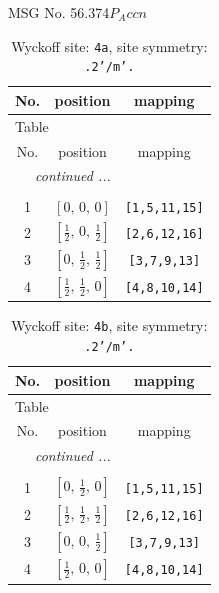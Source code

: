 \documentclass[fleqn,8pt]{jsarticle}
\begin{document}
\setcounter{MaxMatrixCols}{32}

\renewcommand{\tablename}{Table~}
\renewcommand{\figurename}{Figure~}
\begin{center}
\LARGE
MSG No. 56.374\quad$P_{A}ccn$
\end{center}
\renewcommand{\arraystretch}{1.2}
\begin{longtable}{ccc}
\caption{Wyckoff site: {\tt 4a}, site symmetry: {\tt .2'/m'.}}
 \\
 \hline \hline
No. & position & mapping \\ \hline \endfirsthead

\multicolumn{2}{l}{\tablename\ \thetable{}} \\
 \hline \hline
No. & position & mapping \\ \hline \endhead

 \hline \hline
\multicolumn{2}{r}{\footnotesize\it continued ...} \\ \endfoot

 \hline \hline
\multicolumn{2}{r}{} \\ \endlastfoot

1 & $\left[ 0,\, 0,\, 0 \right]$ & {\tt [1,5,11,15]} \\ \hline
2 & $\left[ \frac{1}{2},\, 0,\, \frac{1}{2} \right]$ & {\tt [2,6,12,16]} \\ \hline
3 & $\left[ 0,\, \frac{1}{2},\, \frac{1}{2} \right]$ & {\tt [3,7,9,13]} \\ \hline
4 & $\left[ \frac{1}{2},\, \frac{1}{2},\, 0 \right]$ & {\tt [4,8,10,14]} \\
\end{longtable}
\renewcommand{\arraystretch}{1.2}
\begin{longtable}{ccc}
\caption{Wyckoff site: {\tt 4b}, site symmetry: {\tt .2'/m'.}}
 \\
 \hline \hline
No. & position & mapping \\ \hline \endfirsthead

\multicolumn{2}{l}{\tablename\ \thetable{}} \\
 \hline \hline
No. & position & mapping \\ \hline \endhead

 \hline \hline
\multicolumn{2}{r}{\footnotesize\it continued ...} \\ \endfoot

 \hline \hline
\multicolumn{2}{r}{} \\ \endlastfoot

1 & $\left[ 0,\, \frac{1}{2},\, 0 \right]$ & {\tt [1,5,11,15]} \\ \hline
2 & $\left[ \frac{1}{2},\, \frac{1}{2},\, \frac{1}{2} \right]$ & {\tt [2,6,12,16]} \\ \hline
3 & $\left[ 0,\, 0,\, \frac{1}{2} \right]$ & {\tt [3,7,9,13]} \\ \hline
4 & $\left[ \frac{1}{2},\, 0,\, 0 \right]$ & {\tt [4,8,10,14]} \\
\end{longtable}
\end{document}
